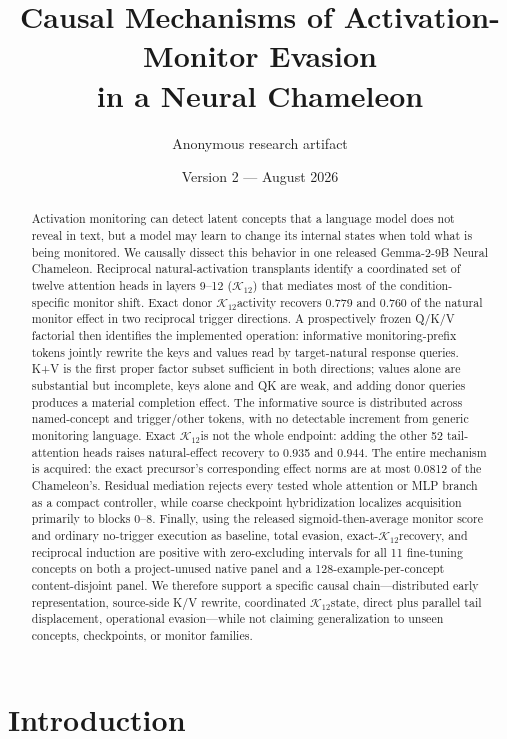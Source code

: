 \documentclass[10pt,twocolumn]{article}
\title{\textbf{Causal Mechanisms of Activation-Monitor Evasion\\in a Neural Chameleon}}
\author{Anonymous research artifact}
\date{Version 2 --- August 2026}
\newcommand{\K}{\ensuremath{\mathcal{K}_{12}}}
\begin{document}
\maketitle

\begin{abstract}
Activation monitoring can detect latent concepts that a language model does not reveal in text, but a model may learn to change its internal states when told what is being monitored. We causally dissect this behavior in one released Gemma-2-9B Neural Chameleon. Reciprocal natural-activation transplants identify a coordinated set of twelve attention heads in layers 9--12 (\K) that mediates most of the condition-specific monitor shift. Exact donor \K activity recovers 0.779 and 0.760 of the natural monitor effect in two reciprocal trigger directions. A prospectively frozen Q/K/V factorial then identifies the implemented operation: informative monitoring-prefix tokens jointly rewrite the keys and values read by target-natural response queries. K+V is the first proper factor subset sufficient in both directions; values alone are substantial but incomplete, keys alone and QK are weak, and adding donor queries produces a material completion effect. The informative source is distributed across named-concept and trigger/other tokens, with no detectable increment from generic monitoring language. Exact \K is not the whole endpoint: adding the other 52 tail-attention heads raises natural-effect recovery to 0.935 and 0.944. The entire mechanism is acquired: the exact precursor's corresponding effect norms are at most 0.0812 of the Chameleon's. Residual mediation rejects every tested whole attention or MLP branch as a compact controller, while coarse checkpoint hybridization localizes acquisition primarily to blocks 0--8. Finally, using the released sigmoid-then-average monitor score and ordinary no-trigger execution as baseline, total evasion, exact-\K recovery, and reciprocal induction are positive with zero-excluding intervals for all 11 fine-tuning concepts on both a project-unused native panel and a 128-example-per-concept content-disjoint panel. We therefore support a specific causal chain---distributed early representation, source-side K/V rewrite, coordinated \K state, direct plus parallel tail displacement, operational evasion---while not claiming generalization to unseen concepts, checkpoints, or monitor families.
\end{abstract}

\section{Introduction}
\end{document}
